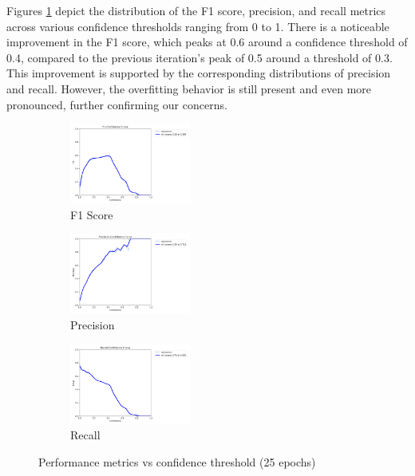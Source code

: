 \documentclass[runningheads]{llncs}
\begin{document}
Figures \ref{fig9} depict the distribution of the F1 score, precision, and recall metrics across various confidence thresholds ranging from 0 to 1. There is a noticeable improvement in the F1 score, which peaks at 0.6 around a confidence threshold of 0.4, compared to the previous iteration's peak of 0.5 around a threshold of 0.3. This improvement is supported by the corresponding distributions of precision and recall. However, the overfitting behavior is still present and even more pronounced, further confirming our concerns.

\begin{figure}[H]
    
    \begin{subfigure}[b]{0.25\textwidth}
        \begin{center}
        \includegraphics[height = 100px]{./figures/fig9a_25e_f1_curve.png}
        \caption{F1 Score}
        \end{center}
    \end{subfigure}
    \hfill
    \begin{subfigure}[b]{0.25\textwidth}
    \begin{center}
        \includegraphics[height = 100px]{./figures/fig9b_25e_P_curve.png}
        \caption{Precision}
        \end{center}
    \end{subfigure}
    \hfill
    \begin{subfigure}[b]{0.25\textwidth}
    \begin{center}
        \includegraphics[height = 100px]{./figures/fig9c_25e_R_curve.png}
        \caption{Recall}
        \end{center}
    \end{subfigure}
    \caption{Performance metrics vs confidence threshold (25 epochs)}
    \label{fig9}
\end{figure}
\end{document}
